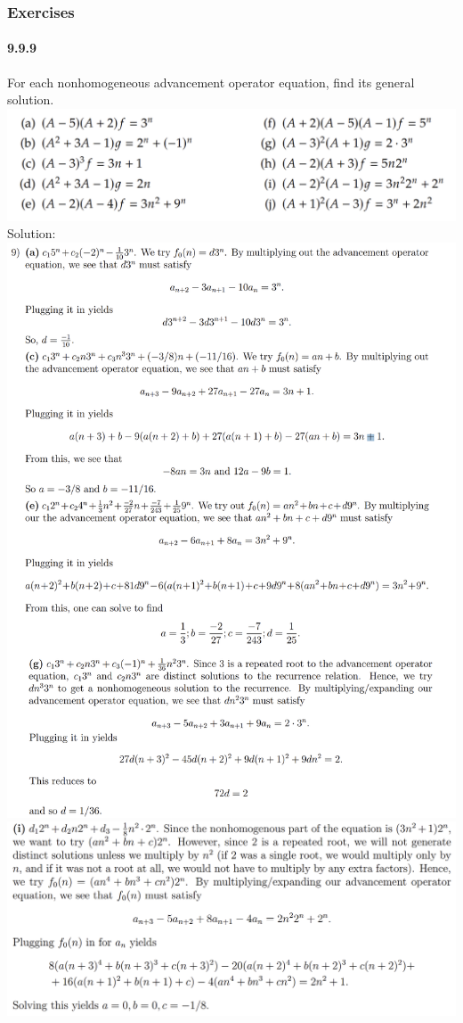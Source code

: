 \documentclass{article}
\begin{document}
\subsubsection{Exercises}
\paragraph{9.9.9}
For each nonhomogeneous advancement operator equation, find its general solution.\newline
\includegraphics{0033}\newline
Solution:\newline
\includegraphics{0046}\newline
\includegraphics{0046-1}
\end{document}
